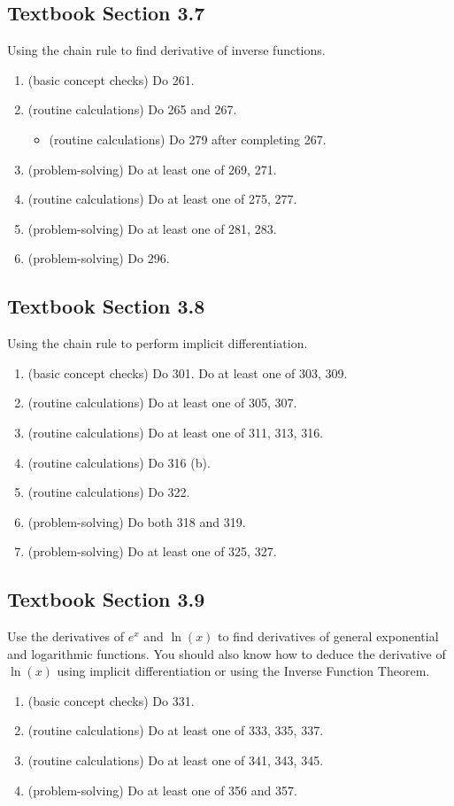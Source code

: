 \documentclass[../main.tex]{subfiles}
\begin{document}
\subsection*{Textbook Section 3.7}

Using the chain rule to find derivative of inverse functions.
\begin{enumerate}
  \item (basic concept checks) Do 261. 
  \item (routine calculations) Do 265 and 267.
    \begin{itemize}
      \item (routine calculations) Do 279 after completing 267.
    \end{itemize}
  \item (problem-solving) Do at least one of 269, 271. 
  \item (routine calculations) Do at least one of 275, 277.
  \item (problem-solving) Do at least one of 281, 283.
  \item (problem-solving) Do 296.
\end{enumerate}

\subsection*{Textbook Section 3.8}

Using the chain rule to perform implicit differentiation.
\begin{enumerate}
  \item (basic concept checks) Do 301. Do at least one of 303, 309.
  \item (routine calculations) Do at least one of 305, 307. 
  \item (routine calculations) Do at least one of 311, 313, 316.
  \item (routine calculations) Do 316 (b).
  \item (routine calculations) Do 322.
  \item (problem-solving) Do both 318 and 319.
  \item (problem-solving) Do at least one of 325, 327.
\end{enumerate}
\clearpage

\subsection*{Textbook Section 3.9}

Use the derivatives of \(e^{x}\) and \(\ln(x)\) to find derivatives of general exponential and logarithmic functions.  You should also know how to deduce the derivative of \(\ln(x)\) using implicit differentiation or using the Inverse Function Theorem.
\begin{enumerate}
  \item (basic concept checks) Do 331.
  \item (routine calculations) Do at least one of 333, 335, 337.
  \item (routine calculations) Do at least one of 341, 343, 345.
  \item (problem-solving) Do at least one of 356 and 357.
\end{enumerate}
\end{document}
